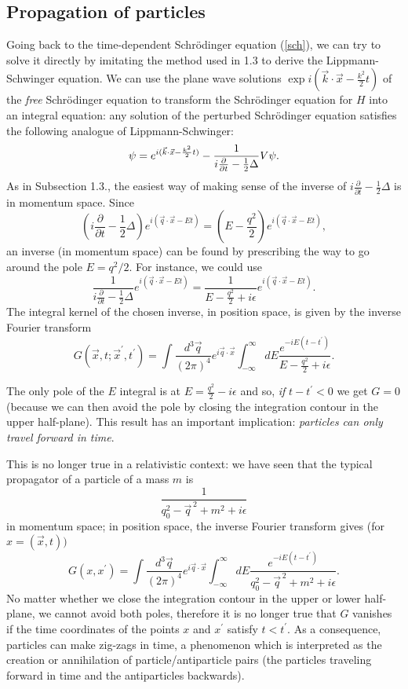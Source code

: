 \documentclass[11pt]{article}
\def\e{\epsilon}
\def\p{\pi}
\def\D{\Delta}
\newcommand{\partialwrt}[1]{\frac{\partial}{\partial{#1}}}
\newcommand{\half}{\frac{1}{2}}
\newcommand{\vk}{{\vec{k}}}
\newcommand{\vx}{{\vec{x}}}
\newcommand{\vq}{{\vec{q}}}
\newcommand{\equ}[1]{\begin{equation}{#1}\end{equation}}
\begin{document}
\subsection{Propagation of particles}
Going back to the time-dependent Schr\"odinger equation (\ref{sch}), we can try 
to solve it directly by imitating the method used in 1.3
to derive the Lippmann-Schwinger
equation. We can use the plane
wave solutions $\exp i(\vk\cdot\vx -\frac{k^2}{2} t)$ of the {\em free}
Schr\"odinger equation to transform the Schr\"odinger equation for $H$
into an integral equation: any solution of the perturbed Schr\"odinger equation
satisfies the following analogue of Lippmann-Schwinger:
\equ{ \label{solsch2} \psi = e^{ i(\vk\cdot\vx -\frac{k^2}{2} t)}
-\frac{1}{i\partialwrt{t} -\half \D} V\psi .}
As in Subsection 1.3., the easiest way of making sense of the inverse
of $i\partialwrt{t} -\half \D$ is in momentum space. Since
\equ{ \left(    i\partialwrt{t} -\half \D   \right)
 e^{i(\vq\cdot\vx -E t)} =\left( E-\frac{q^2}{2} \right) 
e^{i(\vq\cdot\vx -Et)},   }
an inverse (in momentum space) can be found by prescribing the way to go around
the pole $E=q^2 /2$. For instance, we could use
\equ{\frac{1}{i\partialwrt{t} -\half \D} e^{i(\vq\cdot\vx -E t)}=
\frac{1}{E-\frac{q^2}{2} +i\e} e^{i(\vq\cdot\vx -E t)} .}
The integral kernel of the chosen inverse, in position space, is given by
the inverse Fourier transform
\equ{ G(\vx,t;\vx^\prime, t^\prime )=\int \frac{d^3\vq}{(2\p )^4} 
e^{i\vq\cdot\vx}
\int_{-\infty}^{\infty} dE \frac{e^{-iE (t-t^\prime )}}{E-\frac{q^2}{2} +i\e} .}

The only pole of the $E$ integral is at $E=\frac{q^2}{2} - i\e$ and so,
{\em if} $t-t^\prime < 0$ we get $G=0$(because we can then avoid
the pole by closing the integration
contour in the upper half-plane). This result has an important
implication:
{\em particles can only travel forward in time}.

This is no longer true in a relativistic context: we have seen that
the typical propagator of a particle of a mass $m$ is
$$\frac{1}{q_0^2 -\vq^{\, 2} + m^2 +i\e} $$
in momentum space; in position space, the inverse Fourier transform gives
(for $x= (\vx, t))$
\equ{ G(x, x^\prime)=\int \frac{d^3\vq}{(2\p )^4} 
e^{i\vq\cdot\vx}
\int_{-\infty}^{\infty} dE \frac{e^{-iE (t-t^\prime )}}{q_0^2-\vq^{\, 2} +m^2 +i\e} .}
No matter whether we close the integration contour in the upper or lower
half-plane, we cannot avoid both poles, therefore
it is no longer true that $G$ vanishes if the time coordinates of the
points $x$ and $x^\prime$ satisfy $t<t^\prime$. As a consequence,
particles can make zig-zags in time, a phenomenon which is
interpreted as the creation or annihilation
of particle/antiparticle pairs (the particles traveling forward in time
and the antiparticles backwards).
\end{document}
